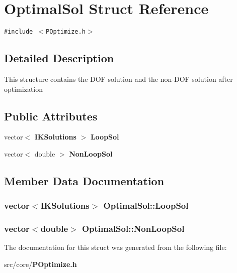 \section{Optimal\-Sol Struct Reference}
\label{structOptimalSol}
{\tt \#include $<$POptimize.h$>$}



\subsection{Detailed Description}
This structure contains the DOF solution and the non-DOF solution after optimization 

\subsection*{Public Attributes}
\begin{CompactItemize}
\item 
vector$<$ {\bf IKSolutions} $>$ {\bf Loop\-Sol}
\item 
vector$<$ double $>$ {\bf Non\-Loop\-Sol}
\end{CompactItemize}


\subsection{Member Data Documentation}
\subsubsection{\setlength{\rightskip}{0pt plus 5cm}vector$<${\bf IKSolutions}$>$ {\bf Optimal\-Sol::Loop\-Sol}}\label{structOptimalSol_6647807db26c9ed7529344853030dc1c}


\subsubsection{\setlength{\rightskip}{0pt plus 5cm}vector$<$double$>$ {\bf Optimal\-Sol::Non\-Loop\-Sol}}\label{structOptimalSol_36f05308d7da2715fc1419dfcc0bfdde}




The documentation for this struct was generated from the following file:\begin{CompactItemize}
\item 
src/core/{\bf POptimize.h}\end{CompactItemize}
